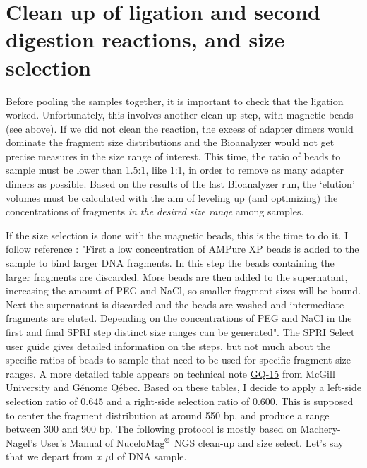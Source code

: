 \documentclass[a4paper,12pt]{article}
\begin{document}
\section{Clean up of ligation and second digestion reactions, and size selection}
Before pooling the samples together, it is important to check that the ligation worked. Unfortunately, this involves another clean-up step, with magnetic beads (see above). If we did not clean the reaction, the excess of adapter dimers would dominate the fragment size distributions and the Bioanalyzer would not get precise measures in the size range of interest. This time, the ratio of beads to sample must be lower than 1.5:1, like 1:1, in order to remove as many adapter dimers as possible. Based on the results of the last Bioanalyzer run, the `elution' volumes must be calculated with the aim of leveling up (and optimizing) the concentrations of fragments \emph{in the desired size range} among samples.

If the size selection is done with the magnetic beads, this is the time to do it. I follow reference \cite{Bronner2009}: "First a low concentration of AMPure XP beads is added to the sample to bind larger DNA fragments. In this step the beads containing the larger fragments are discarded. More beads are then added to the supernatant, increasing the amount of PEG and NaCl, so smaller fragment sizes will be bound. Next the supernatant is discarded and the beads are washed and intermediate fragments are eluted. Depending on the concentrations of PEG and NaCl in the first and final SPRI step distinct size ranges can be generated". The SPRI Select user guide gives detailed information on the steps, but not much about the specific ratios of beads to sample that need to be used for specific fragment size ranges. A more detailed table appears on technical note \href{http://www.gqinnovationcenter.com/documents/technicalNotes/technicalNotes_GQ15.pdf}{GQ-15} from McGill University and Génome Qébec. Based on these tables, I decide to apply a left-side selection ratio of 0.645 and a right-side selection ratio of 0.600. This is supposed to center the fragment distribution at around 550 bp, and produce a range between 300 and 900 bp. The following protocol is mostly based on Machery-Nagel's \href{http://www.gqinnovationcenter.com/documents/technicalNotes/technicalNotes_GQ15.pdf}{User's Manual} of NuceloMag$^{\copyright}$ NGS clean-up and size select. Let's say that we depart from $x$ $\mu$l of DNA sample.
\end{document}
